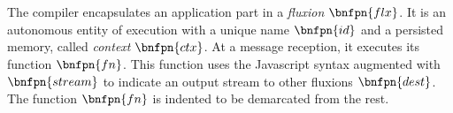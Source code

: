 \vspace{-1\baselineskip}
\begin{bnf*}
      { \bnfor {} \bnfsp {} \bnfsp {}}\\
      { \bnfsp {} \bnfsp {} \bnfsp {} \bnfsp {} \bnfsp {} \bnfsp {}}\\
      { \bnfor {} \bnfor {} \bnfsp {} \bnfsp {}}\\
       { \bnfsp {} }\\
         {}\\
          {\bnfts{\texttt{\{}}  \bnfts{\texttt{\}}}}\\
          {\bnfts{\texttt{[}}  \bnfts{\texttt{]}}}\\
         { \bnfor {} \bnfsp \bnfts{,} \bnfsp {}}\\
           {\bnfts{\texttt{>}\texttt{>}} \bnfor \bnfts{\texttt{-}\texttt{>}}}\\
           {}\\
           {}\\
\end{bnf*}
\vspace{-1.5\baselineskip}~\\
The compiler encapsulates an application part in a \textit{fluxion} $\bnfpn{flx}$.
It is an autonomous entity of execution with a unique name $\bnfpn{id}$ and a persisted memory, called \textit{context} $\bnfpn{ctx}$.
At a message reception, it executes its function $\bnfpn{fn}$.
This function uses the Javascript syntax augmented with $\bnfpn{stream}$ to indicate an output stream to other fluxions $\bnfpn{dest}$.
The function $\bnfpn{fn}$ is indented to be demarcated from the rest.


